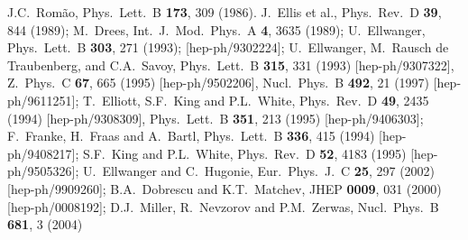\documentclass[12pt]{article}
\begin{document}
\begin{thebibliography}{999}
J.C.~Rom\~ao,
  Phys.\ Lett.\ B {\bf 173}, 309 (1986).
J.~Ellis et al., 
  Phys.\ Rev.\ D {\bf 39}, 844 (1989);
M.~Drees,
  Int.\ J.\ Mod.\ Phys.\ A {\bf 4}, 3635 (1989);
U.~Ellwanger,
  Phys.\ Lett.\ B {\bf 303}, 271 (1993);
  [hep-ph/9302224];
U.~Ellwanger, M.~Rausch de Traubenberg, and C.A.~Savoy,
  Phys.\ Lett.\ B {\bf 315}, 331 (1993)
  [hep-ph/9307322],
  Z.\ Phys.\ C {\bf 67}, 665 (1995)
  [hep-ph/9502206],
  Nucl.\ Phys.\ B {\bf 492}, 21 (1997)
  [hep-ph/9611251];
T.~Elliott, S.F.~King and P.L.~White,
  Phys.\ Rev.\ D {\bf 49}, 2435 (1994)
  [hep-ph/9308309],
  Phys.\ Lett.\ B {\bf 351}, 213 (1995)
  [hep-ph/9406303];
F.~Franke, H.~Fraas and A.~Bartl, 
  Phys.\ Lett.\ B {\bf 336}, 415 (1994)
  [hep-ph/9408217];
S.F.~King and P.L.~White, 
  Phys.\ Rev.\ D {\bf 52}, 4183 (1995)
  [hep-ph/9505326];
U.~Ellwanger and C.~Hugonie,
  Eur.\ Phys.\ J.\ C {\bf 25}, 297 (2002)
  [hep-ph/9909260];
B.A.~Dobrescu and K.T.~Matchev,
  JHEP {\bf 0009}, 031 (2000)
  [hep-ph/0008192];
D.J.~Miller, R.~Nevzorov and P.M.~Zerwas,
  Nucl.\ Phys.\ B {\bf 681}, 3 (2004)

\end{thebibliography}
\end{document}
